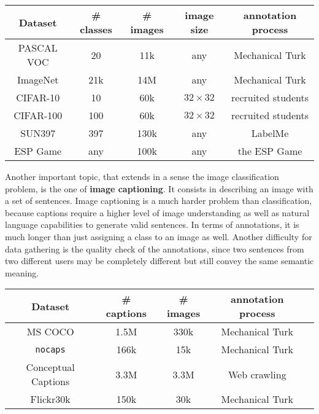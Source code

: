 \vspace{0.5cm}

\begin{center}
	\begin{tabular}{|c|c|c|c|c|}
		\hline
		Dataset & \# classes & \# images & image size & annotation process \\
		\hline
		PASCAL VOC & 20 & 11k & any & Mechanical Turk \\
		ImageNet & 21k & 14M & any & Mechanical Turk \\
		CIFAR-10 & 10 & 60k & $32 \times 32$ & recruited students \\
		CIFAR-100 & 100 & 60k & $32 \times 32$ & recruited students \\
		SUN397 & 397 & 130k & any & LabelMe \\
		ESP Game & any & 100k & any & the ESP Game \\
		\hline
	\end{tabular}
\end{center}
\vspace{0.5cm}

Another important topic, that extends in a sense the image classification problem, is the one of \textbf{image captioning}. It consists in describing an image with a set of sentences. Image captioning is a much harder problem than classification, because captions require a higher level of image understanding as well as natural language capabilities to generate valid sentences. In terms of annotations, it is much longer than just assigning a class to an image as well. Another difficulty for data gathering is the quality check of the annotations, since two sentences from two different users may be completely different but still convey the same semantic meaning. 

\vspace{0.5cm}

\begin{center}
	\begin{tabular}{|c|c|c|c|c|}
		\hline
		Dataset & \# captions & \# images & annotation process \\
		\hline
		MS COCO \cite{chen2015microsoft} & 1.5M & 330k & Mechanical Turk \\
		\texttt{nocaps} \cite{agrawal2019nocaps} & 166k & 15k & Mechanical Turk \\
		Conceptual Captions \cite{sharma-etal-2018-conceptual} & 3.3M & 3.3M & Web crawling \\
		Flickr30k \cite{flickr30k} & 150k & 30k & Mechanical Turk \\
		\hline
	\end{tabular}
\end{center}
\vspace{0.5cm}

